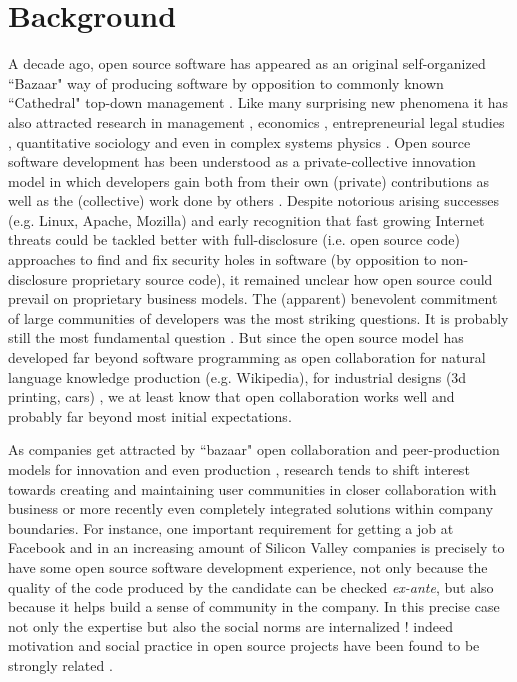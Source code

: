 \section{Background}
\label{background}
A decade ago, open source software has appeared as an original self-organized ``Bazaar" way of producing software by opposition to commonly known ``Cathedral" top-down management \cite{raymond1999}. Like many surprising new phenomena it has also attracted research in management \cite{vonkrogh2006pro}, economics \cite{tirole2002some}, entrepreneurial legal studies \cite{benkler2002},  quantitative sociology \cite{crowston2005social} and even in complex systems physics \cite{maillart2008,tessone2011}. Open source software development has been understood as a private-collective innovation model in which developers gain both from their own (private) contributions as well as the (collective) work done by others \cite{vonhippel2003oss}. Despite notorious arising successes (e.g. Linux, Apache, Mozilla) and early recognition that fast growing Internet threats could be tackled better with full-disclosure (i.e. open source code) approaches to find and fix security holes in software (by opposition to non-disclosure  proprietary source code), it remained unclear how open source could prevail on proprietary business models.  The (apparent) benevolent commitment of large communities of developers was the most striking questions. It is probably still the most fundamental question \cite{benkler2011leviathan}. But since the open source model has developed far beyond software programming as open collaboration for natural language knowledge production (e.g. Wikipedia), for industrial designs (3d printing, cars) \cite{raasch2009,pearce2012}, we at least know that open collaboration works well and probably far beyond most initial expectations. 


As companies get attracted by  ``bazaar" open collaboration and \linebreak peer-production models for innovation \cite{} and even production \cite{hamel2011first}, research tends to shift interest towards creating and maintaining user communities \cite{vonHippel2001} in closer collaboration with business  \cite{bonaccorsi2004ais} or more recently even completely integrated solutions within company boundaries. For instance, one important requirement for getting a job at Facebook and in an increasing amount of Silicon Valley companies is precisely to have some open source software development experience, not only because the quality  of the code produced by the candidate can be checked {\it ex-ante}, but also because it helps build a sense of community in the company. In this precise case not only the expertise but also the social norms are internalized ! indeed motivation and social practice in open source projects have been found to be strongly related \cite{robert2006,vonKrogh2012}.

